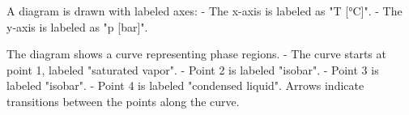 A diagram is drawn with labeled axes:  
- The x-axis is labeled as "T [°C]".  
- The y-axis is labeled as "p [bar]".  

The diagram shows a curve representing phase regions.  
- The curve starts at point 1, labeled "saturated vapor".  
- Point 2 is labeled "isobar".  
- Point 3 is labeled "isobar".  
- Point 4 is labeled "condensed liquid".  
Arrows indicate transitions between the points along the curve.